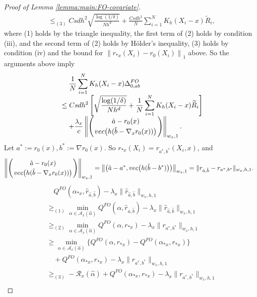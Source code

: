 \documentclass[11pt]{article}
\begin{document}
\begin{proof}[Proof of Lemma \ref{lemma:main:FO-covariate}]
$$\begin{array}{rl}
&\displaystyle \leq_{(3)} Csdh^2\sqrt{\frac{\log(1/\delta)}{Nh^d}} +  \frac{Csdh^2}{N}\sum_{i=1}^N K_h(X_i-x)\widetilde{R}_i,
\end{array}$$
where (1) holds by the triangle inequality, the first term of (2) holds by condition (iii), and the second term of (2) holds by H\"older's inequality, (3) holds by condition (iv) and the bound for $\left\|  r_{*x}(X_i)-r_0(X_i) \right\|_1$ above. So the arguments above imply
\begin{equation}\label{eq:bound:I:II}
\begin{array}{rl}
    &\quad\displaystyle\frac{1}{N}\sum_{i=1}^N K_h(X_i-x)\Delta_{0,ab}^{FO}\\
    &\displaystyle\leq Csdh^2\left[\sqrt{\frac{\log(1/\delta)}{Nh^d}} +  \frac{1}{N}\sum_{i=1}^N K_h(X_i-x)\widetilde{R}_i\right]\\
    &\displaystyle\quad+\frac{\lambda_x}{c}\left\|\left( {\hat a - r_0(x)}\atop{ {\rm vec}\big(h(\hat b - \nabla_xr_0(x)})\big)\right) \right\|_{w_x,1}.
\end{array}
\end{equation}
Let $a^*:=r_0(x), b^*:=\nabla r_0(x)$. So $r_{*x}(X_i)=r_{a^*,b^*}(X_i,x)$, and 
$$\left\|\left( {\hat a - r_0(x)}\atop{ {\rm vec}\big(h(\hat b - \nabla_xr_0(x)})\big)\right) \right\|_{w_x,1}=\big\|\big(\hat a - a^*,{\rm vec}\big(h(\hat b - b^*)\big)\big)\big\|_{w_x,1}=\|r_{\hat{a},\hat{b}}-r_{a^*,b^*}\|_{w_x,h,1}.$$
\begin{equation}\label{eq:covariate:main:steps}
\begin{array}{rl}
&\quad\displaystyle Q^{FO}(\alpha_{*x},\hat r_{\hat a,\hat b}) - \lambda_x \|\hat r_{\hat a,\hat b}\|_{w_x,h,1}\\
& \geq_{(1)}\displaystyle \min_{\alpha \in \mathcal{A}_x(\hat\alpha)} Q^{FO}(\alpha,\hat r_{\hat a,\hat b}) - \lambda_x \|\hat r_{\hat a,\hat b}\|_{w_x,h,1} \\
& \displaystyle \geq_{(2)} \min_{\alpha \in \mathcal{A}_x(\hat\alpha)} Q^{FO}(\alpha,r_{*x}) - \lambda_x \|r_{a^*,b^*}\|_{w_x,h,1}\\
&\displaystyle \geq \min_{\alpha \in \mathcal{A}_x(\hat\alpha)} \{Q^{FO}(\alpha,r_{*x})-Q^{FO}(\alpha_{*x},r_{*x})\} \\
&\quad + Q^{FO}(\alpha_{*x},r_{*x})- \lambda_x \|r_{a^*,b^*}\|_{w_x,h,1} \\
&\displaystyle  \geq_{(3)}  - \mathcal{R}_x(\hat\alpha) + Q^{FO}(\alpha_{*x},r_{*x})- \lambda_x \|r_{a^*,b^*}\|_{w_x,h,1} \\
\end{array}

\end{equation}
\end{proof}
\end{document}
